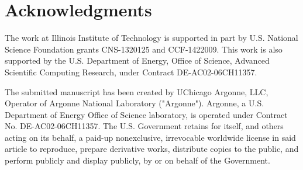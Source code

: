 \documentclass[conference,compsoc]{IEEEtran}
\begin{document}



\ifCLASSOPTIONcompsoc
  \section*{Acknowledgments}
\else
\fi


The work at Illinois Institute of Technology is supported in part by U.S. National Science Foundation grants CNS-1320125 and CCF-1422009. This work is also supported by the U.S. Department of Energy, Office of Science, Advanced Scientific Computing Research, under Contract DE-AC02-06CH11357.





  


 \vspace{5\baselineskip}
 
 \begin{framed}
 The submitted manuscript has been created by UChicago Argonne, LLC, Operator of Argonne National Laboratory ("Argonne").  Argonne, a U.S. Department of Energy Office of Science laboratory, is operated under Contract No. DE-AC02-06CH11357.  The U.S. Government retains for itself, and others acting on its behalf, a paid-up nonexclusive, irrevocable worldwide license in said article to reproduce, prepare derivative works, distribute copies to the public, and perform publicly and display publicly, by or on behalf of the Government.
 \end{framed}




\end{document}
